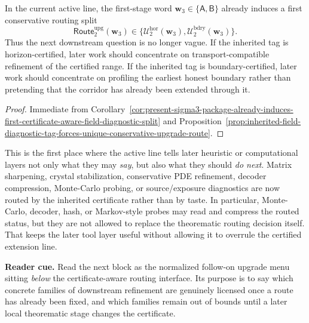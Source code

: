 \begin{corollary}
\label{cor:present-sigma3-package-already-induces-first-conservative-upgrade-routing-split}
In the current active line, the first-stage word \(\mathbf w_3\in\{\mathsf A,\mathsf B\}\) already induces a first conservative routing split
\[
 \mathsf{Route}^{\mathrm{upg}}_{2}(\mathbf w_3)
 \in
 \{\mathcal U^{\mathrm{hor}}_{2}(\mathbf w_3),\mathcal U^{\mathrm{bdry}}_{2}(\mathbf w_3)\}.
\]
Thus the next downstream question is no longer vague. If the inherited tag is horizon-certified, later work should concentrate on transport-compatible refinement of the certified range. If the inherited tag is boundary-certified, later work should concentrate on profiling the earliest honest boundary rather than pretending that the corridor has already been extended through it.
\end{corollary}

\begin{proof}
Immediate from Corollary~\ref{cor:present-sigma3-package-already-induces-first-certificate-aware-field-diagnostic-split} and Proposition~\ref{prop:inherited-field-diagnostic-tag-forces-unique-conservative-upgrade-route}.
\end{proof}

\begin{remark}
\label{rem:what-this-upgrade-routing-interface-now-buys}
This is the first place where the active line tells later heuristic or computational layers not only what they may \emph{say}, but also what they should \emph{do next}. Matrix sharpening, crystal stabilization, conservative PDE refinement, decoder compression, Monte-Carlo probing, or source/exposure diagnostics are now routed by the inherited certificate rather than by taste. In particular, Monte-Carlo, decoder, hash, or Markov-style probes may read and compress the routed status, but they are not allowed to replace the theorematic routing decision itself. That keeps the later tool layer useful without allowing it to overrule the certified extension line.
\end{remark}




\noindent\textbf{Reader cue.} Read the next block as the normalized follow-on upgrade menu sitting \emph{below} the certificate-aware routing interface. Its purpose is to say which concrete families of downstream refinement are genuinely licensed once a route has already been fixed, and which families remain out of bounds until a later local theorematic stage changes the certificate.

